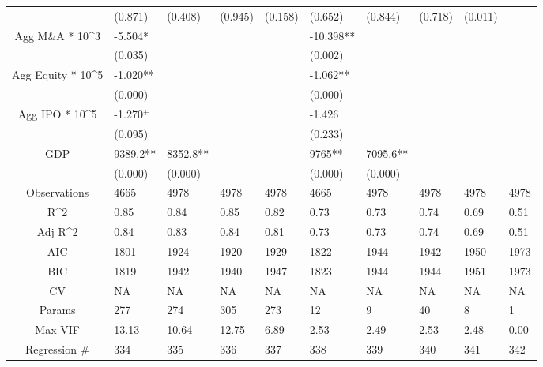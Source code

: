 \documentclass{article}
\begin{document}
\begin{table}[H]
\begin{tabular}{|clllllllll|}
   & (0.871) & (0.408) & (0.945) & (0.158) & (0.652) & (0.844) & (0.718) & (0.011) &  \\ 
  Agg M\&A * 10^3 & -5.504* &  &  &  & -10.398** &  &  &  &  \\ 
   & (0.035) &  &  &  & (0.002) &  &  &  &  \\ 
  Agg Equity * 10^5 & -1.020** &  &  &  & -1.062** &  &  &  &  \\ 
   & (0.000) &  &  &  & (0.000) &  &  &  &  \\ 
  Agg IPO * 10^5 & -1.270$^{+}$ &  &  &  & -1.426 &  &  &  &  \\ 
   & (0.095) &  &  &  & (0.233) &  &  &  &  \\ 
  GDP & 9389.2** & 8352.8** &  &  & 9765** & 7095.6** &  &  &  \\ 
   & (0.000) & (0.000) &  &  & (0.000) & (0.000) &  &  &  \\ 
  \hline 
 Observations & 4665 & 4978 & 4978 & 4978 & 4665 & 4978 & 4978 & 4978 & 4978 \\ 
  R^2 & 0.85 & 0.84 & 0.85 & 0.82 & 0.73 & 0.73 & 0.74 & 0.69 & 0.51 \\ 
  Adj R^2 & 0.84 & 0.83 & 0.84 & 0.81 & 0.73 & 0.73 & 0.74 & 0.69 & 0.51 \\ 
  AIC & 1801 & 1924 & 1920 & 1929 & 1822 & 1944 & 1942 & 1950 & 1973 \\ 
  BIC & 1819 & 1942 & 1940 & 1947 & 1823 & 1944 & 1944 & 1951 & 1973 \\ 
  CV & NA & NA & NA & NA & NA & NA & NA & NA & NA \\ 
  Params & 277 & 274 & 305 & 273 & 12 & 9 & 40 & 8 & 1 \\ 
  Max VIF & 13.13 & 10.64 & 12.75 & 6.89 & 2.53 & 2.49 & 2.53 & 2.48 & 0.00 \\ 
  Regression \# & 334 & 335 & 336 & 337 & 338 & 339 & 340 & 341 & 342 \\ 
   \hline
\end{tabular}
 
\end{table}
\end{document}
